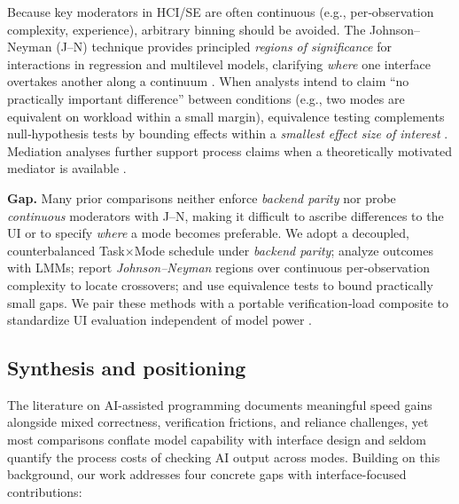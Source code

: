 \documentclass[sigconf]{acmart}
\begin{document}
Because key moderators in HCI/SE are often continuous (e.g., per‑observation complexity, experience), arbitrary binning should be avoided. The Johnson–Neyman (J–N) technique provides principled \emph{regions of significance} for interactions in regression and multilevel models, clarifying \emph{where} one interface overtakes another along a continuum \cite{johnson1950johnson,d2004johnson,preacher2006tools,bauer2005probing}. When analysts intend to claim “no practically important difference” between conditions (e.g., two modes are equivalent on workload within a small margin), equivalence testing complements null‑hypothesis tests by bounding effects within a \emph{smallest effect size of interest} \cite{lakens2017tost,lakens2018tutorial}. Mediation analyses further support process claims when a theoretically motivated mediator is available \cite{hayes2013mediation}.

\textbf{Gap.} Many prior comparisons neither enforce \emph{backend parity} nor probe \emph{continuous} moderators with J–N, making it difficult to ascribe differences to the UI or to specify \emph{where} a mode becomes preferable. We adopt a decoupled, counterbalanced Task$\times$Mode schedule under \emph{backend parity}; analyze outcomes with LMMs; report \emph{Johnson–Neyman} regions over continuous per‑observation complexity to locate crossovers; and use equivalence tests to bound practically small gaps. We pair these methods with a portable verification‑load composite to standardize UI evaluation independent of model power \cite{williams1949experimental,bates2015lme4,kuznetsova2017lmerTest,luke2017evaluatingLMM,matuschek2017typeIpower,preacher2006tools,bauer2005probing,lakens2017tost,lakens2018tutorial,hayes2013mediation}.

\subsection{Synthesis and positioning}
\label{sec:rw-synthesis-positioning}

The literature on AI-assisted programming documents meaningful speed gains alongside mixed correctness, verification frictions, and reliance challenges, yet most comparisons conflate model capability with interface design and seldom quantify the process costs of checking AI output across modes. Building on this background, our work addresses four concrete gaps with interface-focused contributions:
\end{document}
